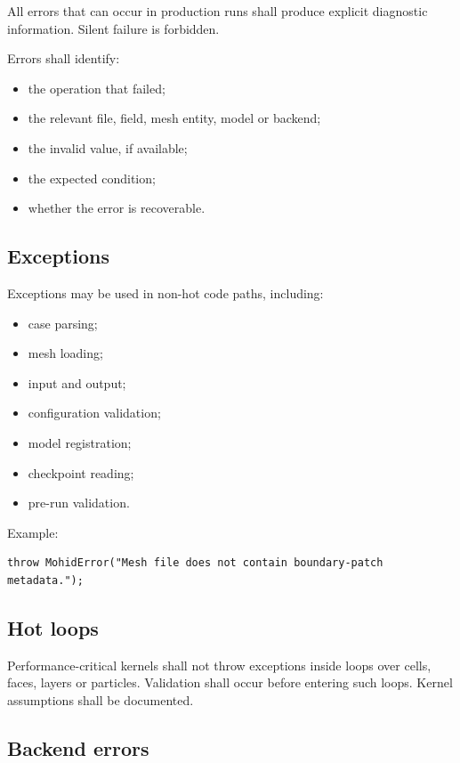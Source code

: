 \documentclass[11pt,a4paper]{article}
\begin{document}
All errors that can occur in production runs shall produce explicit diagnostic information. Silent failure is forbidden.

Errors shall identify:

\begin{itemize}
  \item the operation that failed;
  \item the relevant file, field, mesh entity, model or backend;
  \item the invalid value, if available;
  \item the expected condition;
  \item whether the error is recoverable.
\end{itemize}

\subsection{Exceptions}

Exceptions may be used in non-hot code paths, including:

\begin{itemize}
  \item case parsing;
  \item mesh loading;
  \item input and output;
  \item configuration validation;
  \item model registration;
  \item checkpoint reading;
  \item pre-run validation.
\end{itemize}

Example:

\begin{lstlisting}[style=mohidcpp]
throw MohidError("Mesh file does not contain boundary-patch metadata.");
\end{lstlisting}

\subsection{Hot loops}

Performance-critical kernels shall not throw exceptions inside loops over cells, faces, layers or particles. Validation shall occur before entering such loops. Kernel assumptions shall be documented.

\subsection{Backend errors}
\end{document}
